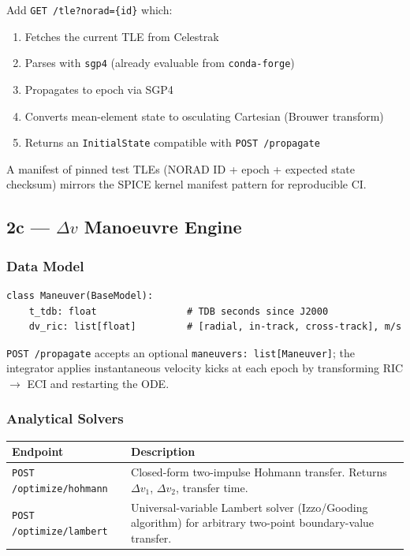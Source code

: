 \documentclass[11pt, a4paper]{article}
\begin{document}
Add \texttt{GET /tle?norad=\{id\}} which:
\begin{enumerate}[noitemsep]
  \item Fetches the current TLE from Celestrak
  \item Parses with \texttt{sgp4} (already evaluable from \texttt{conda-forge})
  \item Propagates to epoch via SGP4
  \item Converts mean-element state to osculating Cartesian (Brouwer transform)
  \item Returns an \texttt{InitialState} compatible with \texttt{POST /propagate}
\end{enumerate}

A manifest of pinned test TLEs (NORAD ID + epoch + expected state checksum)
mirrors the SPICE kernel manifest pattern for reproducible CI.

\subsection{2c — $\Delta v$ Manoeuvre Engine}

\subsubsection{Data Model}

\begin{verbatim}
class Maneuver(BaseModel):
    t_tdb: float                # TDB seconds since J2000
    dv_ric: list[float]         # [radial, in-track, cross-track], m/s
\end{verbatim}

\texttt{POST /propagate} accepts an optional \texttt{maneuvers: list[Maneuver]};
the integrator applies instantaneous velocity kicks at each epoch by
transforming RIC $\to$ ECI and restarting the ODE.

\subsubsection{Analytical Solvers}

\begin{center}
\begin{tabular}{L{3.5cm} L{9cm}}
  \toprule
  \textbf{Endpoint} & \textbf{Description} \\
  \midrule
  \texttt{POST /optimize/hohmann}  &
    Closed-form two-impulse Hohmann transfer. Returns $\Delta v_1$,
    $\Delta v_2$, transfer time. \\[4pt]
  \texttt{POST /optimize/lambert}  &
    Universal-variable Lambert solver (Izzo/Gooding algorithm) for
    arbitrary two-point boundary-value transfer. \\
  \bottomrule
\end{tabular}
\end{center}
\end{document}
